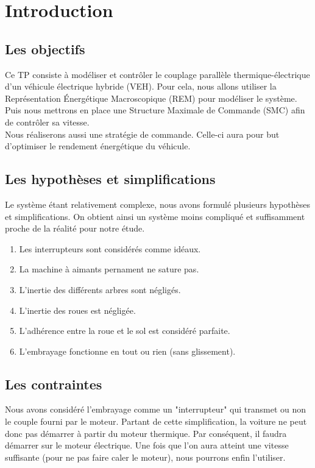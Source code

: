 \section{Introduction}

\subsection{Les objectifs}

	Ce TP consiste à modéliser et contrôler le couplage parallèle thermique-électrique d'un véhicule électrique hybride (VEH). Pour cela, nous allons utiliser la Représentation Énergétique Macroscopique (REM) pour modéliser le système. Puis nous mettrons en place une Structure Maximale de Commande (SMC) afin de contrôler sa vitesse.\\
	Nous réaliserons aussi une stratégie de commande. Celle-ci aura pour but d'optimiser le rendement énergétique du véhicule.

\subsection{Les hypothèses et simplifications}

	Le système étant relativement complexe, nous avons formulé plusieurs hypothèses et simplifications. On obtient ainsi un système moins compliqué et suffisamment proche de la réalité pour notre étude. 

\begin{enumerate} 
\item Les interrupteurs sont considérés comme idéaux.
\item La machine à aimants pernament ne sature pas.
\item L'inertie des différents arbres sont négligés.
\item L'inertie des roues est négligée.
\item L'adhérence entre la roue et le sol est considéré parfaite. 
\item L'embrayage fonctionne en tout ou rien (sans glissement).
\end{enumerate}

\subsection{Les contraintes}
	Nous avons considéré l'embrayage comme un "interrupteur" qui transmet ou non le couple fourni par le moteur. Partant de cette simplification, la voiture ne peut donc pas démarrer à partir du moteur thermique. Par conséquent, il faudra démarrer sur le moteur électrique. Une fois que l'on aura atteint une vitesse suffisante (pour ne pas faire caler le moteur), nous pourrons enfin l'utiliser.

